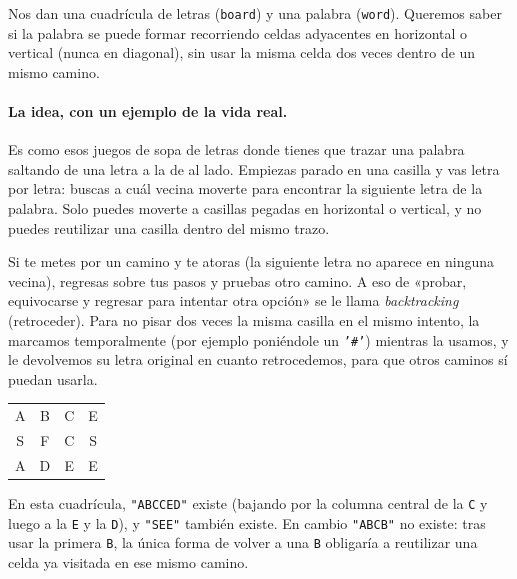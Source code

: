 
Nos dan una cuadrícula de letras (\texttt{board}) y una palabra
(\texttt{word}). Queremos saber si la palabra se puede formar recorriendo
celdas adyacentes en horizontal o vertical (nunca en diagonal), sin usar la
misma celda dos veces dentro de un mismo camino.

\paragraph{La idea, con un ejemplo de la vida real.} Es como esos juegos de
sopa de letras donde tienes que trazar una palabra saltando de una letra a la
de al lado. Empiezas parado en una casilla y vas letra por letra: buscas a cuál
vecina moverte para encontrar la siguiente letra de la palabra. Solo puedes
moverte a casillas pegadas en horizontal o vertical, y no puedes reutilizar una
casilla dentro del mismo trazo.

Si te metes por un camino y te atoras (la siguiente letra no aparece en ninguna
vecina), regresas sobre tus pasos y pruebas otro camino. A eso de «probar,
equivocarse y regresar para intentar otra opción» se le llama
\emph{backtracking} (retroceder). Para no pisar dos veces la misma casilla en el
mismo intento, la marcamos temporalmente (por ejemplo poniéndole un
\texttt{'\#'}) mientras la usamos, y le devolvemos su letra original en cuanto
retrocedemos, para que otros caminos sí puedan usarla.

\begin{center}
\ttfamily
\begin{tabular}{cccc}
A & B & C & E\\
S & F & C & S\\
A & D & E & E\\
\end{tabular}
\end{center}

\noindent En esta cuadrícula, \texttt{"ABCCED"} existe (bajando por la
columna central de la \texttt{C} y luego a la \texttt{E} y la \texttt{D}), y
\texttt{"SEE"} también existe. En cambio \texttt{"ABCB"} no existe: tras usar
la primera \texttt{B}, la única forma de volver a una \texttt{B} obligaría a
reutilizar una celda ya visitada en ese mismo camino.

